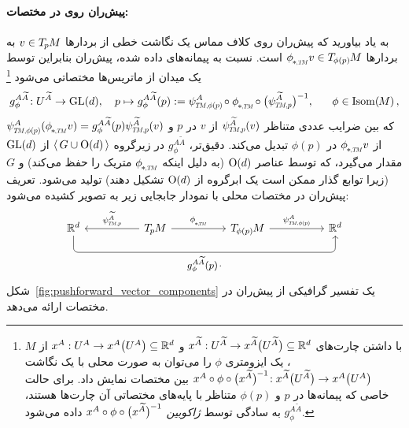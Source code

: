 \paragraph{پیش‌ران روی  در مختصات:}
به یاد بیاورید که پیش‌ران روی کلاف مماس یک نگاشت خطی از بردارها $v\in T_{\mkern-1.5mu p}\mkern-.5muM$ به بردارها $\dphiTM v \in \TphipM$ است.
نسبت به پیمانه‌های داده شده، پیش‌ران بنابراین توسط یک میدان از ماتریس‌ها مختصاتی می‌شود%
\footnote{
    با داشتن چارت‌های
    $x^{\widetilde{A}}: U^{\widetilde{A}} \to x^{\widetilde{A}}\big(U^{\widetilde{A}}\big) \subseteq \mathbb{R}^d$
    و
    $x^A: U^A \to x^A\big(U^A\big) \subseteq \mathbb{R}^d$
    از $M$، یک ایزومتری $\phi$ را می‌توان به صورت محلی با یک نگاشت
    $x^A \circ \phi \circ \big(x^{\widetilde{A}}\big)^{\mkern-1mu-1}\!: x^{\widetilde{A}}\big(U^{\widetilde{A}}\big) \to x^A\big(U^A\big)$
    بین مختصات نمایش داد.
    برای حالت خاصی که پیمانه‌ها در $p$ و $\phi(p)$ متناظر با پایه‌های مختصاتی آن چارت‌ها هستند، $g_\phi^{A\widetilde{A}}$ به سادگی توسط \emph{ژاکوبین} $x^A \circ \phi \circ \big(x^{\widetilde{A}}\big)^{\mkern-1mu-1}$ داده می‌شود.
}
\begin{align}\label{eq:pushforward_TM_coord}
    g_\phi^{A\widetilde{A}}\!: U^{\widetilde{A}} \to \GL{d},\ \ \ 
    p \mapsto g_\phi^{A\widetilde{A}}(p) := \psiTMphip^A \mkern-2mu\circ \dphiTM \mkern-2mu\circ \big(\psiTMp^{\widetilde{A}}\big)^{-1}
    , \quad\ \ \phi \in \IsomM \,,
\end{align}
که بین ضرایب عددی متناظر $\psiTMp^{\widetilde{A}}(v)$ از $v$ در $p$ و $\psiTMphip^A(\dphiTM v) = g_\phi^{A\widetilde{A}}(p) \psiTMp^{\widetilde{A}}(v)$ از $\dphiTM v$ در $\phi(p)$ تبدیل می‌کند.
دقیق‌تر، $g_\phi^{A\widetilde{A}}$ در زیرگروه $\langle\, G\cup\operatorname{O}(d) \,\rangle$ از $\operatorname{GL}(d)$ مقدار می‌گیرد، که توسط عناصر $\operatorname{O}(d)$ (به دلیل اینکه $\dphiTM$ متریک را حفظ می‌کند) و $G$ (زیرا توابع گذار ممکن است یک ابرگروه از $\operatorname{O}(d)$ تشکیل دهند) تولید می‌شود.
تعریف پیش‌ران در مختصات محلی با نمودار جابجایی زیر به تصویر کشیده می‌شود:
\begin{equation}\label{cd:pushforward_TM_coord}
    \begin{tikzcd}[row sep=4.em, column sep=5em]
        \R^d
            \arrow[rrr, pos=.5, rounded corners, to path={ 
                    -- ([yshift=-3.5ex]\tikztostart.south) 
                    --node[below]{\small$
                        g_\phi^{A\widetilde{A}}(p) \mkern2mu\cdot
                        $} ([yshift=-3.5ex]\tikztotarget.south) 
                    -- (\tikztotarget.south)
                    }]
        &
        \TpM
            \arrow[l, "\psiTMp^{\widetilde{A}}"']
            \arrow[r, "\dphiTM"]
        &
        \TphipM
            \arrow[r, "\psiTMphip^A"]
        &
        \R^d
    \end{tikzcd}
\end{equation}
شکل~\ref{fig:pushforward_vector_components} یک تفسیر گرافیکی از پیش‌ران در مختصات ارائه می‌دهد.


